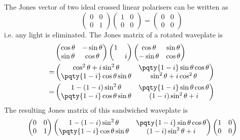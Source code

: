 \documentclass[12pt]{extarticle}
\begin{document}
\begin{outline}[enumerate]
        \1 \2 The Jones vector of two ideal crossed linear polarisers can be written as \[
            \begin{pmatrix} 0&0\\0&1 \end{pmatrix} \begin{pmatrix}1&0\\0&0\end{pmatrix} = \begin{pmatrix} 0&0\\0&0 \end{pmatrix} 
        \]
        i.e. any light is eliminated.
        \2 The Jones matrix of a rotated waveplate is \begin{align*}
            &\begin{pmatrix} \cos \theta &-\sin\theta \\ \sin\theta &\cos\theta  \end{pmatrix} \begin{pmatrix} 1&\\ &i \end{pmatrix} \begin{pmatrix} \cos \theta &\sin\theta \\-\sin\theta &\cos\theta  \end{pmatrix} \\
            =& \begin{pmatrix} \cos^2\theta + i\sin^2\theta & \pqty{1 - i}\sin\theta \cos\theta \\ \pqty{1 - i}\cos\theta \sin\theta & \sin^2\theta + i\cos^2\theta   \end{pmatrix}\\ 
            =& \begin{pmatrix} 1 - (1 - i)\sin^2\theta & \pqty{1 - i}\sin\theta \cos\theta \\ \pqty{1 - i}\cos\theta \sin\theta & (1 - i)\sin^2\theta + i  \end{pmatrix} 
        \end{align*}
        The resulting Jones matrix of this sandwiched waveplate is \begin{align*}
            &\begin{pmatrix} 0&0\\0&1 \end{pmatrix}\begin{pmatrix} 1 - (1 - i)\sin^2\theta & \pqty{1 - i}\sin\theta \cos\theta \\ \pqty{1 - i}\cos\theta \sin\theta & (1 - i)\sin^2\theta + i  \end{pmatrix} \begin{pmatrix} 1&0\\0&0\end{pmatrix}\\

\end{align*}
\end{outline}
\end{document}

